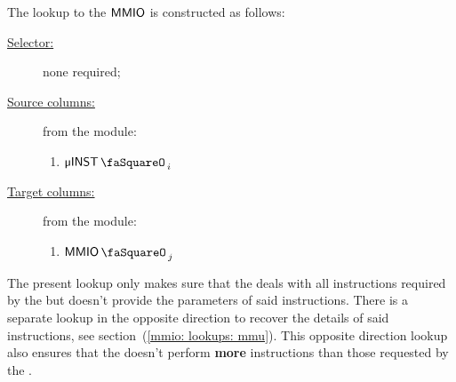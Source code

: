 The lookup to the $\textsf{MMIO}$ is constructed as follows:
\begin{description}
	\item[\underline{Selector:}] none required;
	\item[\underline{Source columns:}] from the \mmuMod{} module:
		\begin{multicols}{2}
			\begin{enumerate}
				\item $\microStamp_{i}$
			\end{enumerate}
		\end{multicols}
	\item[\underline{Target columns:}] from the \mmioMod{} module: 
	\begin{multicols}{2}
			\begin{enumerate}
				\item $\mmioStamp_{j}$
			\end{enumerate}
		\end{multicols}
\end{description}
\saNote{}
The present lookup only makes sure that the \mmioMod{} deals with all instructions required by the \mmuMod{} but doesn't provide the parameters of said instructions.
There is a separate lookup in the opposite direction to recover the details of said \mmioMod{} instructions, see section~(\ref{mmio: lookups: mmu}).
This opposite direction lookup also ensures that the \mmioMod{} doesn't perform \textbf{more} instructions than those requested by the \mmuMod{}.
